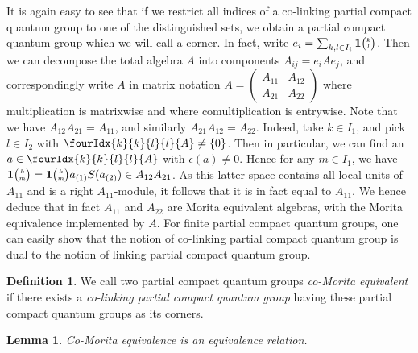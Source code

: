 \documentclass[10pt]{article}
\newcommand{\Grt}[3]{#1{\tiny {\begin{pmatrix} #2\\#3\end{pmatrix}}}}
\newcommand{\UnitC}[2]{\Grt{\mathbf{1}}{#1}{#2}}
\newcommand{\Gr}[5]{\fourIdx{#2}{#4}{#3}{#5}{#1}}%
\newtheorem{Lem}[Theorem]{Lemma}
\theoremstyle{definition}
\newtheorem{Def}[Theorem]{Definition}
\numberwithin{equation}{section}
\begin{document}
It is again easy to see that if we restrict all indices of a co-linking partial compact quantum group to one of the distinguished sets, we obtain a partial compact quantum group which we will call a corner. In fact, write $e_i = \sum_{k,l\in I_i} \UnitC{k}{l}$. Then we can decompose the total algebra $A$ into components $A_{ij} = e_{i}Ae_{j}$, and correspondingly write $A$ in matrix notation $A = \begin{pmatrix} A_{11} & A_{12}  \\ A_{21} & A_{22}\end{pmatrix}$ where multiplication is matrixwise and where comultiplication is entrywise. Note that we have $A_{12}A_{21} = A_{11}$, and similarly $A_{21}A_{12} = A_{22}$. Indeed, take $k\in I_1$, and pick $l\in I_2$ with $\Gr{A}{k}{l}{k}{l}\neq \{0\}$. Then in particular, we can find an $a\in \Gr{A}{k}{l}{k}{l}$ with $\epsilon(a)\neq 0$. Hence for any $m\in I_1$, we have $\UnitC{k}{m} = \UnitC{k}{m} a_{(1)}S(a_{(2)}) \in A_{12}A_{21}$. As this latter space contains all local units of $A_{11}$ and is a right $A_{11}$-module, it follows that it is in fact equal to $A_{11}$. We hence deduce that in fact $A_{11}$ and $A_{22}$ are Morita equivalent algebras, with the Morita equivalence implemented by $A$. For finite partial compact quantum groups, one can easily show that the notion of co-linking partial compact quantum group is dual to the notion of linking partial compact quantum group.

\begin{Def} We call two partial compact quantum groups \emph{co-Morita equivalent} if there exists a \emph{co-linking partial compact quantum group} having these partial compact quantum groups as its corners.
\end{Def}

\begin{Lem} Co-Morita equivalence is an equivalence relation. 
\end{Lem} 
\end{document}
